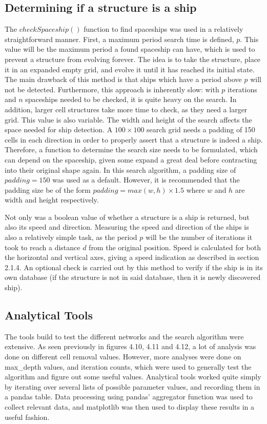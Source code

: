 \documentclass{l4proj}
\begin{document}
\subsection{Determining if a structure is a ship}

The $checkSpaceship()$ function to find spaceships was used in a relatively straightforward manner. First, a maximum period search time is defined, $p$. This value will be the maximum period a found spaceship can have, which is used to prevent a structure from evolving forever. The idea is to take the structure, place it in an expanded empty grid, and evolve it until it has reached its initial state. The main drawback of this method is that ships which have a period above $p$ will not be detected. Furthermore, this approach is inherently slow: with $p$ iterations and $n$ spaceships needed to be checked, it is quite heavy on the search. In addition, larger cell structures take more time to check, as they need a larger grid. This value is also variable. The width and height of the search affects the space needed for ship detection. A $100 \times 100$ search grid needs a padding of 150 cells in each direction in order to properly assert that a structure is indeed a ship. Therefore, a function to determine the search size needs to be formulated, which can depend on the spaceship, given some expand a great deal before contracting into their original shape again. In this search algorithm, a padding size of $padding = 150$ was used as a default. However, it is recommended that the padding size be of the form $padding = max(w, h) \times 1.5$ where $w$ and $h$ are width and height respectively.

Not only was a boolean value of whether a structure is a ship is returned, but also its speed and direction. Measuring the speed and direction of the ships is also a relatively simple task, as the period $p$ will be the number of iterations it took to reach a distance $d$ from the original position. Speed is calculated for both the horizontal and vertical axes, giving a speed indication as described in section 2.1.4. An optional check is carried out by this method to verify if the ship is in its own database (if the structure is not in said database, then it is newly discovered ship).

\subsection{Analytical Tools}

The tools build to test the different networks and the search algorithm were extensive. As seen previously in figures 4.10, 4.11 and 4.12, a lot of analysis was done on different cell removal values. However, more analyses were done on max\_depth values, and iteration counts, which were used to generally test the algorithm and figure out some useful values. Analytical tools worked quite simply by iterating over several lists of possible parameter values, and recording them in a pandas table.  Data processing using pandas' aggregator function was used to collect relevant data, and matplotlib was then used to display these results in a useful fashion. 
\end{document}

